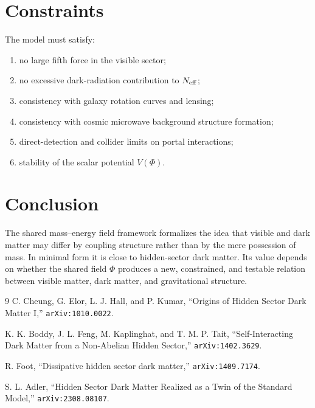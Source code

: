 \documentclass[11pt]{article}
\theoremstyle{remark}
\begin{document}
\section{Constraints}
The model must satisfy:
\begin{enumerate}[leftmargin=2em]
    \item no large fifth force in the visible sector;
    \item no excessive dark-radiation contribution to $N_{\rm eff}$;
    \item consistency with galaxy rotation curves and lensing;
    \item consistency with cosmic microwave background structure formation;
    \item direct-detection and collider limits on portal interactions;
    \item stability of the scalar potential $V(\Phi)$.
\end{enumerate}

\section{Conclusion}
The shared mass--energy field framework formalizes the idea that visible and dark matter may differ by coupling structure rather than by the mere possession of mass. In minimal form it is close to hidden-sector dark matter. Its value depends on whether the shared field $\Phi$ produces a new, constrained, and testable relation between visible matter, dark matter, and gravitational structure.

\begin{thebibliography}{9}
C. Cheung, G. Elor, L. J. Hall, and P. Kumar,
``Origins of Hidden Sector Dark Matter I,''
\texttt{arXiv:1010.0022}.

K. K. Boddy, J. L. Feng, M. Kaplinghat, and T. M. P. Tait,
``Self-Interacting Dark Matter from a Non-Abelian Hidden Sector,''
\texttt{arXiv:1402.3629}.

R. Foot,
``Dissipative hidden sector dark matter,''
\texttt{arXiv:1409.7174}.

S. L. Adler,
``Hidden Sector Dark Matter Realized as a Twin of the Standard Model,''
\texttt{arXiv:2308.08107}.
\end{thebibliography}
\end{document}
